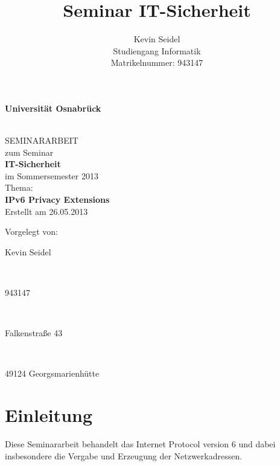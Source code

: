 \documentclass[a4paper, 12pt]{scrartcl}
\title{Seminar IT-Sicherheit}
\author{Kevin Seidel \\ Studiengang Informatik \\ Matrikelnummer: 943147}
\begin{document}
\begin{titlepage}
\begin{center}
\vspace*{1.5cm}
\begin{Large}
\textbf{Universität Osnabrück}
\end{Large}

\noindent\hrulefill
\\[3.5cm]
SEMINARARBEIT \\[1cm]
zum Seminar \\[1cm]
\textbf{IT-Sicherheit} \\[1.5cm]
im Sommersemester 2013 \\[1.5cm]
Thema: \\[0.5cm]
\textbf{IPv6 Privacy Extensions} \\[2cm]
Erstellt am 26.05.2013
\end{center}
\vfill
\begin{flushleft}
Vorgelegt von: 
\hfill \parbox{46mm}{Kevin Seidel} \\
\hfill \parbox{46mm}{943147} \\
\hfill \parbox{46mm}{Falkenstraße 43} \\
\hfill \parbox{46mm}{49124 Georgsmarienhütte}
\end{flushleft}
\end{titlepage}

\newpage

\setcounter{page}{2}
\tableofcontents

\newpage
{}
\setcounter{page}{1}

\section{Einleitung}
Diese Seminararbeit behandelt das Internet Protocol version 6 und dabei insbesondere die Vergabe und Erzeugung der Netzwerkadressen.
\end{document}
